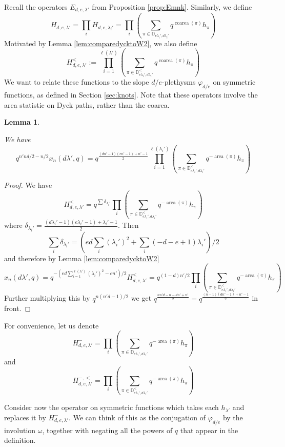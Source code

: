 \documentclass{amsart}
\numberwithin{equation}{section}
\newtheorem{lemma}{Lemma}[section]
\theoremstyle{definition}
\newcommand{\Dyck}{\mathbb{D}}
\DeclareMathOperator{\area}{\mathrm{area}}
\DeclareMathOperator{\coarea}{\mathrm{coarea}}
\begin{document}
 Recall the operators  $E_{d,e,\lambda'}$ from Proposition \ref{prop:Emnk}. Similarly, we define 
\begin{equation}
    \label{def:Hlambda}
    H_{d,e,\lambda'}=\prod_i H_{d,e,\lambda_i'}=\prod_{i}\left(\sum_{\pi \in \Dyck_{e\lambda_i',d\lambda_i'}}q^{\coarea(\pi)}h_\pi\right)
\end{equation}
Motivated by Lemma \ref{lem:comparedycktoW2}, we also define $$H^<_{d,e,\lambda'}:=\prod_{i=1}^{\ell(\lambda')}
\left(\sum_{\pi \in \Dyck_{e\lambda_i',d\lambda_i'}^<} q^{\coarea(\pi)}h_\pi\right)$$
We want to relate these functions to the slope $d/e$-plethysms $\varphi_{d/e}$ on symmetric functions, as defined in Section \ref{sec:knots}. Note that these operators involve the area statistic on Dyck paths, rather than the coarea.
\begin{lemma}
\label{lem:coareatoarea}

We have 
$$q^{n'nd/2-n/2}x_n(d\lambda',q)=q^{\frac{(dn'-1)(en'-1)+n'-1}{2}}\prod_{i=1}^{\ell(\lambda_i')}\left(\sum_{\pi\in\Dyck_{e\lambda_i',d\lambda_i'}^<}q^{-\area(\pi)}h_\pi\right)$$

\end{lemma}
\begin{proof}
    We have 
$$H^<_{d,e,\lambda'}=q^{\sum \delta_{\lambda_i'}} \prod_i \left(\sum_{\pi \in \Dyck_{e\lambda_i',d\lambda_i'}^<} q^{-\area(\pi)}h_\pi\right)$$
where $\delta_{\lambda_i'}=\frac{(d\lambda_i'-1)(e\lambda_i'-1)+\lambda_i'-1}{2}$.
Then $$\sum_{i}\delta_{\lambda_i'}=
(ed \sum_i (\lambda_i')^2+\sum_i (-d-e+1)\lambda_i')/2
$$ and therefore by Lemma \ref{lem:comparedycktoW2} $$
x_n(d\lambda',q)=q^{-(ed\sum_{i=1}^{\ell(\lambda')}(\lambda_i')^2-en')/2}H^{<}_{d,e,\lambda'}
=q^{(1-d)n'/2}\prod_i \left(\sum_{\pi \in \Dyck_{e\lambda_i',d\lambda_i'}^<} q^{-\area(\pi)}h_\pi\right)
$$
Further multiplying this by $q^{n(n'd-1)/2}$ we get
$q^{\frac{nn'd-n-dn'+n'}{2}}=q^{\frac{(n-1)(dn'-1)+n'-1}{2}}$ in front.

\end{proof}

For convenience, let us denote $$
H^-_{d,e,\lambda'}=\prod_i\left(\sum_{\pi\in\Dyck_{e\lambda_i',d\lambda_i'}}q^{-\area(\pi)}h_\pi\right)
$$
and
$$H^{-,<}_{d,e,\lambda'}=\prod_i\left(\sum_{\pi\in\Dyck_{e\lambda_i',d\lambda_i'}^<}q^{-\area(\pi)}h_\pi\right)$$

Consider now the operator on symmetric functions which takes each $h_{\lambda'}$ and replaces it by $H^-_{d,e,\lambda'}$. 
We can think of this as the conjugation of $\varphi_{d/e}$ by the involution $\omega$, together with negating all the powers of $q$ that appear in the definition. 
\end{document}
